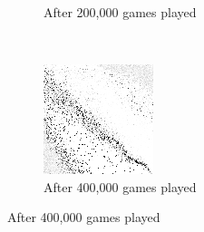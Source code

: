 \begin{figure}
\begin{subfigure}[t]{0.3\textwidth}
	\caption{After 200,000 games played}
	\end{subfigure}
	~
	\begin{subfigure}[t]{0.3\textwidth}
	\includegraphics[width=\textwidth]{images/findings/round2/flipbook/winner/checkpoint_400000.png}
	\caption{After 400,000 games played}
	\end{subfigure}


\end{figure}
